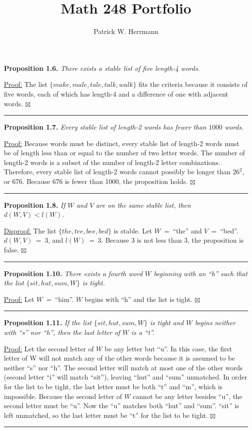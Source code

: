 \documentclass[a4paper,12pt]{article}
\newcommand{\entry}[3]
{
   \noindent\textbf{#1.}
   \emph{#2}
   \bigskip

   \noindent#3
   \bigskip
   \hrule
   \vspace{24pt}
}
\newcommand{\sig}{$\boxtimes$}
\begin{document}
\title{Math 248 Portfolio}
\author{Patrick W. Herrmann}
\maketitle


\entry{Proposition 1.6}
{There exists a stable list of five length-4 words.}
{\underline{Proof:} The list $\{ make, male, tale, talk, walk \}$ fits the criteria because it consists of five words, each of which has length-4 and a difference of one with adjacent words. \sig}



\entry{Proposition 1.7}
{Every stable list of length-2 words has fewer than $1000$ words.}
{\underline{Proof:} Because words must be distinct, every stable list of length-2 words must be of length less than or equal to the number of two letter words. The number of length-2 words is a subset of the number of length-2 letter combinations. Therefore, every stable list of length-2 words cannot possibly be longer than $26^2$, or 676. Because 676 is fewer than 1000, the proposition holds. \sig}


\entry{Proposition 1.8}
{If $W$ and $V$ are on the same stable list, then $d(W, V) < l(W)$.}
{\underline{Disproof:} The list $\{ the, tee, bee, bed \}$ is stable. Let $W$~=~``the'' and $V$~=~``bed''. $d(W, V)$~=~3, and $l(W)$~=~3. Because 3 is not less than 3, the proposition is false. \sig}



\entry{Proposition 1.10}
{There exists a fourth word $W$ beginning with an ``h'' such that the list $\{ sit, hut, sum, W \}$ is tight.}
{\underline{Proof:} Let $W$~=~``him''. $W$ begins with ``h'' and the list is tight. \sig}



\entry{Proposition 1.11}
{If the list $\{ sit, hut, sum, W \}$ is tight and $W$ begins neither with ``s'' nor ``h'', then the last letter of $W$ is a ``t''.}
{\underline{Proof:} Let the second letter of $W$ be any letter but ``u''. In this case, the first letter of W will not match any of the other words because it is assumed to be neither ``s'' nor ``h''. The second letter will match at most one of the other words (second letter ``i'' will match ``sit''), leaving ``hut'' and ``sum'' unmatched. In order for the list to be tight, the last letter must be both ``t'' and ``m'', which is impossible. Because the second letter of $W$ cannot be any letter besides ``u'', the second letter must be ``u''. Now the ``u'' matches both ``hut'' and ``sum''. ``sit'' is left unmatched, so the last letter must be ``t'' for the list to be tight. \sig}
\end{document}
